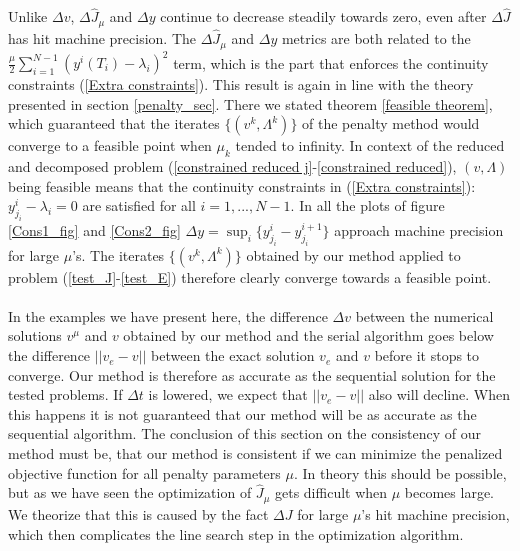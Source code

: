 \\
\\
Unlike $\Delta v$, $\Delta\hat J_{\mu}$ and $\Delta y$ continue to decrease steadily towards zero, even after $\Delta \hat J$ has hit machine precision. The $\Delta\hat J_{\mu}$ and $\Delta y$ metrics are both related to the $\frac{\mu }{2}\sum_{i=1}^{N-1}(y^i(T_{i})-\lambda_i)^2$ term, which is the part that enforces the continuity constraints (\ref{Extra constraints}). This result is again in line with the theory presented in section \ref{penalty_sec}. There we stated theorem \ref{feasible theorem}, which guaranteed that the iterates $\{(v^{k},\Lambda^k)\}$ of the penalty method would converge to a feasible point when $\mu_k$ tended to infinity. In context of the reduced and decomposed problem (\ref{constrained reduced j}-\ref{constrained reduced}), $(v,\Lambda)$ being feasible means that the continuity constraints in (\ref{Extra constraints}): $y_{j_i}^i -\lambda_i =0$ are satisfied for all $i=1,...,N-1$. In all the plots of figure \ref{Cons1_fig} and \ref{Cons2_fig} $\Delta y= \sup_i\{y_{j_i}^i-y_{j_i}^{i+1}\}$ approach machine precision for large $\mu$'s. The iterates $\{(v^{k},\Lambda^k)\}$ obtained by our method applied to problem (\ref{test_J}-\ref{test_E}) therefore clearly converge towards a feasible point.
\\
\\
In the examples we have present here, the difference $\Delta v$ between the numerical solutions $v^{\mu}$ and $v$ obtained by our method and the serial algorithm goes below the difference $||v_e-v||$ between the exact solution $v_e$ and $v$ before it stops to converge. Our method is therefore as accurate as the sequential solution for the tested problems. If $\Delta t$ is lowered, we expect that $||v_e-v||$ also will decline. When this happens it is not guaranteed that our method will be as accurate as the sequential algorithm. The conclusion of this section on the consistency of our method must be, that our method is consistent if we can minimize the penalized objective function for all penalty parameters $\mu$. In theory this should be possible, but as we have seen the optimization of $\hat J_{\mu}$ gets difficult when $\mu$ becomes large. We theorize that this is caused by the fact $\Delta J$ for large $\mu$'s hit machine precision, which then complicates the line search step in the optimization algorithm. 
